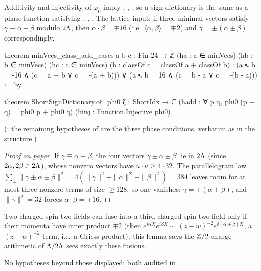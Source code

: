 \begin{theorem}\label{ch21:thm:ofphi0}
Additivity and injectivity of $\varphi_0$ imply , , ;
so a sign dictionary is the same as a phase function satisfying , ,
.  The lattice input: if three minimal vectors satisfy $\gamma\equiv\alpha+\beta$ modulo
$2{\Lambda}$, then $\alpha\cdot\beta=\mp16$ (i.e.\ $\langle\alpha,\beta\rangle=\mp2$) and
$\gamma=\pm(\alpha\pm\beta)$ correspondingly.
\end{theorem}
\begin{leancode}
theorem minVecs_class_add_cases {a b c : Fin 24 → ℤ} (ha : a ∈ minVecs) (hb : b ∈ minVecs)
    (hc : c ∈ minVecs) (h : classOf c = classOf a + classOf b) :
    (a ⬝ᵥ b = -16 ∧ (c = a + b ∨ c = -(a + b))) ∨ (a ⬝ᵥ b = 16 ∧ (c = b - a ∨ c = -(b - a))) := by
\end{leancode}
\begin{leancode}
theorem ShortSignDictionary.of_phi0 {ζ : ShortIdx → ℂ}
    (hadd : ∀ p q, phi0 (p + q) = phi0 p + phi0 q) (hinj : Function.Injective phi0)
\end{leancode}
(; the remaining hypotheses of
 are the three phase conditions, verbatim as in the structure.)
\begin{proof}[Proof on paper]
If $\gamma\equiv\alpha+\beta$, the four vectors $\gamma\pm\alpha\pm\beta$ lie in $2{\Lambda}$ (since
$2\alpha,2\beta\in2{\Lambda}$), whose nonzero vectors have $u\cdot u\ge4\cdot32$.  The parallelogram law
$\sum_\pm\|\gamma\pm\alpha\pm\beta\|^2=4(\|\gamma\|^2+\|\alpha\|^2+\|\beta\|^2)=384$ leaves room for at most
three nonzero terms of size $\ge128$, so one vanishes: $\gamma=\pm(\alpha\pm\beta)$, and $\|\gamma\|^2=32$
forces $\alpha\cdot\beta=\mp16$.
\end{proof}
\begin{physics}
Two charged spin-two fields can fuse into a third charged spin-two field only if their momenta have
inner product $\mp2$ (then $e^{i\alpha X}e^{i\beta X}\sim(z-w)^{-2}e^{i(\alpha+\beta)X}$, a
$(z-w)^{-2}$ term, i.e.\ a Griess product); this lemma says the ${\mathbb{Z}}/2$ charge arithmetic of
${\Lambda}/2{\Lambda}$ sees exactly these fusions.
\end{physics}
\begin{status}
No hypotheses beyond those displayed; both audited in .
\end{status}

